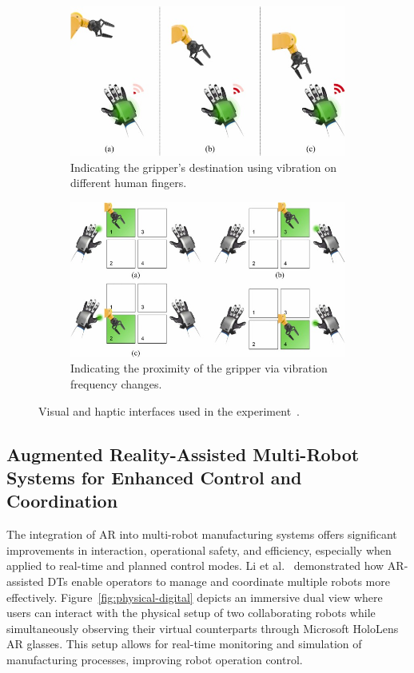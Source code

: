 \begin{figure}[htp]
    \centering
    \begin{subfigure}{.49\textwidth}
        \centering
        \includegraphics[width=0.9\linewidth]{figs/haptic-cues.jpg}
        \caption{Indicating the gripper’s destination using vibration on different human fingers.}
        \label{fig:sfig1}
    \end{subfigure}%
    \begin{subfigure}{.49\textwidth}
        \centering
        \includegraphics[width=0.9\linewidth]{figs/visual-cues.jpg}
        \caption{Indicating the proximity of the gripper via vibration frequency changes.}
        \label{fig:sfig2}
    \end{subfigure}
    \caption{Visual and haptic interfaces used in the experiment~\cite{CHU2023313}.}
    \label{fig:haptic-visual-cues}
\end{figure}

\subsection{Augmented Reality-Assisted Multi-Robot Systems for Enhanced Control and Coordination}
The integration of \ac{AR} into multi-robot manufacturing systems offers significant improvements in interaction, operational safety, and efficiency, especially when applied to real-time and planned control modes. Li et al.~\cite{LI2022102321} demonstrated how \ac{AR}-assisted \ac{DTs} enable operators to manage and coordinate multiple robots more effectively. Figure~\ref{fig:physical-digital} depicts an immersive dual view where users can interact with the physical setup of two collaborating robots while simultaneously observing their virtual counterparts through Microsoft HoloLens \ac{AR} glasses. This setup allows for real-time monitoring and simulation of manufacturing processes, improving robot operation control.

